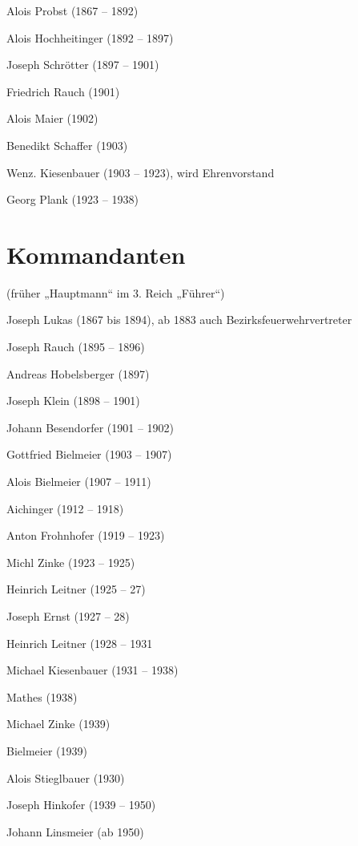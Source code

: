 \documentclass[12pt,a4paper]{book}
\begin{document}
\begin{compactitem}
\item Alois Probst (1867 – 1892)
\item Alois Hochheitinger (1892 – 1897)
\item Joseph Schrötter (1897 – 1901)
\item Friedrich Rauch (1901)
\item Alois Maier (1902)
\item Benedikt Schaffer (1903)
\item Wenz. Kiesenbauer (1903 – 1923), wird Ehrenvorstand
\item Georg Plank (1923 – 1938)
\end{compactitem}

\section*{Kommandanten}

(früher „Hauptmann“ im 3. Reich „Führer“)

\begin{compactitem}
\item Joseph Lukas (1867 bis 1894), ab 1883 auch Bezirksfeuerwehrvertreter
\item Joseph Rauch (1895 – 1896)
\item Andreas Hobelsberger (1897)
\item Joseph Klein (1898 – 1901)
\item Johann Besendorfer (1901 – 1902)
\item Gottfried Bielmeier (1903 – 1907)
\item Alois Bielmeier (1907 – 1911)
\item Aichinger (1912 – 1918)
\item Anton Frohnhofer (1919 – 1923)
\item Michl Zinke (1923 – 1925)
\item Heinrich Leitner (1925 – 27)
\item Joseph Ernst (1927 – 28)
\item Heinrich Leitner (1928 – 1931
\item Michael Kiesenbauer (1931 – 1938)
\item Mathes (1938)
\item Michael Zinke (1939)
\item Bielmeier (1939)
\item Alois Stieglbauer (1930)
\item Joseph Hinkofer (1939 – 1950)
\item Johann Linsmeier (ab 1950)
\end{compactitem}
\end{document}
